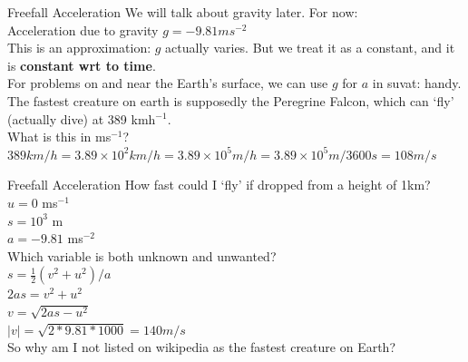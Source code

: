 \begin{frame}{Freefall Acceleration}
\small
We will talk about gravity later. For now: \\[1ex]

Acceleration due to gravity $g = -9.81 ms^{-2}$\\[1ex]

This is an approximation: $g$ actually varies. But we treat it as a constant, and it is \textbf{constant wrt to time}.\\[1ex]

For problems on and near the Earth's surface, we can use $g$ for $a$ in suvat: handy.\\[3ex]

The fastest creature on earth is supposedly the Peregrine Falcon, which can `fly' (actually dive) at 389 kmh$^{-1}$.\\[1ex]

What is this in ms$^{-1}$?\\[6ex]

$389 km/h = 3.89\times10^2 km/h = 3.89\times10^5 m/h = 3.89\times10^5 m / 3600 s =108 m/s $\\
\end{frame}



\begin{frame}{Freefall Acceleration}
\small
How fast could I `fly' if dropped from a height of 1km?\\[15ex]

$u = 0$ ms$^{-1}$\\
$s = 10^3$ m\\
$a = -9.81$ ms$^{-2}$\\

Which variable is both unknown and unwanted?\\[2ex]

$s =  \frac{1}{2} (v^2 +u^2)/a$\\
$2as =  v^2 +u^2$\\
$v = \sqrt{2as - u^2}$\\
$|v| = \sqrt{2*9.81*1000} = 140 m/s$\\

So why am I not listed on wikipedia as the fastest creature on Earth?


\end{frame}






%



